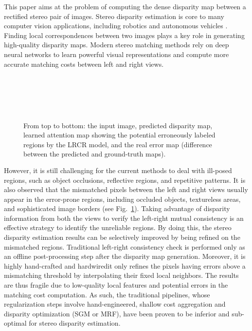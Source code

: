 \documentclass[10pt,twocolumn,letterpaper]{article}
\begin{document}
This paper aims at the problem of computing the dense disparity map between a rectified stereo pair of images. Stereo disparity estimation is   core to many computer vision applications, including robotics and autonomous vehicles  \cite{geiger2013vision, Geiger2012CVPR, maddern2016real}.  Finding local correspondences between two images plays a key role in generating high-quality disparity maps.  Modern   stereo matching methods rely on deep neural networks to learn powerful visual representations and compute  more accurate  matching costs between  left and right views.

\begin{figure}
	\captionsetup[subfigure]{labelformat=empty}
	\centering
	\\
	\vspace{-0.75cm}
	\\
	\vspace{-0.75cm}
	\\
	\vspace{-0.75cm}
	\\
	\vspace{-0.5cm}
	\caption{From top to bottom: the input image,  predicted disparity map, learned attention map showing the potential erroneously labeled regions by the LRCR model, and the real error map (difference between the predicted and ground-truth maps).}
	\vspace{-0.7cm}
	\label{fig:fig1}
	
\end{figure}

However, it is still challenging for the current methods to deal with ill-posed regions, such as object occlusions, reflective regions, and repetitive patterns.  It is also observed that the mismatched pixels between the left and right views usually appear in the error-prone regions, including occluded objects, textureless areas, and sophisticated image borders (see Fig.~\ref{fig:fig1}).   Taking advantage of disparity information from  both the views to verify the left-right mutual consistency  is an effective strategy to identify the unreliable regions. By doing this,  the stereo disparity estimation results can be selectively improved by being refined on the mismatched regions. Traditional left-right consistency check is performed only as an offline post-processing step after the disparity map generation. Moreover, it is highly hand-crafted and hardwired\textemdash it only refines the pixels having errors   above a   mismatching threshold by interpolating their fixed local neighbors. The results are thus fragile due to low-quality local features and potential errors in the matching cost computation.  As such,  the traditional pipelines, whose regularization steps involve hand-engineered, shallow cost aggregation and disparity optimization (SGM or MRF), have been proven to be inferior \cite{seki2016patch} and sub-optimal for  stereo disparity estimation. 
\end{document}
